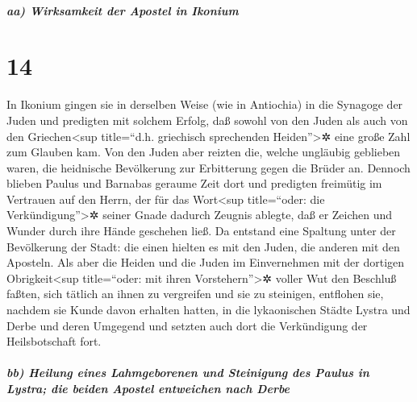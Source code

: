 \hypertarget{aa-wirksamkeit-der-apostel-in-ikonium}{%
\subparagraph{aa) Wirksamkeit der Apostel in
Ikonium}\label{aa-wirksamkeit-der-apostel-in-ikonium}}

\hypertarget{section-13}{%
\section{14}\label{section-13}}

 In Ikonium gingen sie in derselben Weise (wie in
Antiochia) in die Synagoge der Juden und predigten mit solchem Erfolg,
daß sowohl von den Juden als auch von den Griechen\textless sup
title=``d.h. griechisch sprechenden Heiden''\textgreater✲ eine große
Zahl zum Glauben kam.  Von den Juden aber reizten die,
welche ungläubig geblieben waren, die heidnische Bevölkerung zur
Erbitterung gegen die Brüder an.  Dennoch blieben Paulus
und Barnabas geraume Zeit dort und predigten freimütig im Vertrauen auf
den Herrn, der für das Wort\textless sup title=``oder: die
Verkündigung''\textgreater✲ seiner Gnade dadurch Zeugnis ablegte, daß er
Zeichen und Wunder durch ihre Hände geschehen ließ.  Da
entstand eine Spaltung unter der Bevölkerung der Stadt: die einen
hielten es mit den Juden, die anderen mit den Aposteln. 
Als aber die Heiden und die Juden im Einvernehmen mit der dortigen
Obrigkeit\textless sup title=``oder: mit ihren Vorstehern''\textgreater✲
voller Wut den Beschluß faßten, sich tätlich an ihnen zu vergreifen und
sie zu steinigen,  entflohen sie, nachdem sie Kunde davon
erhalten hatten, in die lykaonischen Städte Lystra und Derbe und deren
Umgegend  und setzten auch dort die Verkündigung der
Heilsbotschaft fort.

\hypertarget{bb-heilung-eines-lahmgeborenen-und-steinigung-des-paulus-in-lystra-die-beiden-apostel-entweichen-nach-derbe}{%
\subparagraph{bb) Heilung eines Lahmgeborenen und Steinigung des Paulus
in Lystra; die beiden Apostel entweichen nach
Derbe}\label{bb-heilung-eines-lahmgeborenen-und-steinigung-des-paulus-in-lystra-die-beiden-apostel-entweichen-nach-derbe}}

